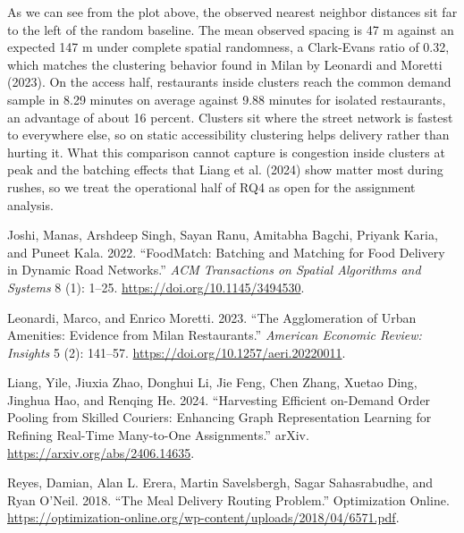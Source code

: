 \documentclass[
  11pt,
]{article}
\newlength{\cslhangindent}
\newenvironment{CSLReferences}[2] %
 {\begin{list}{}{%
  \setlength{\itemindent}{0pt}
  \setlength{\leftmargin}{0pt}
  \setlength{\parsep}{0pt}
  \ifodd #1
   \setlength{\leftmargin}{\cslhangindent}
   \setlength{\itemindent}{-1\cslhangindent}
  \fi
  \setlength{\itemsep}{#2\baselineskip}}}
 {\end{list}}
\begin{document}
As we can see from the plot above, the observed nearest neighbor
distances sit far to the left of the random baseline. The mean observed
spacing is 47 m against an expected 147 m under complete spatial
randomness, a Clark-Evans ratio of 0.32, which matches the clustering
behavior found in Milan by Leonardi and Moretti (2023). On the access
half, restaurants inside clusters reach the common demand sample in 8.29
minutes on average against 9.88 minutes for isolated restaurants, an
advantage of about 16 percent. Clusters sit where the street network is
fastest to everywhere else, so on static accessibility clustering helps
delivery rather than hurting it. What this comparison cannot capture is
congestion inside clusters at peak and the batching effects that Liang
et al. (2024) show matter most during rushes, so we treat the
operational half of RQ4 as open for the assignment analysis.

\label{refs}
\begin{CSLReferences}{1}{0}
Joshi, Manas, Arshdeep Singh, Sayan Ranu, Amitabha Bagchi, Priyank
Karia, and Puneet Kala. 2022. {``FoodMatch: Batching and Matching for
Food Delivery in Dynamic Road Networks.''} \emph{ACM Transactions on
Spatial Algorithms and Systems} 8 (1): 1--25.
\url{https://doi.org/10.1145/3494530}.

Leonardi, Marco, and Enrico Moretti. 2023. {``The Agglomeration of Urban
Amenities: Evidence from Milan Restaurants.''} \emph{American Economic
Review: Insights} 5 (2): 141--57.
\url{https://doi.org/10.1257/aeri.20220011}.

Liang, Yile, Jiuxia Zhao, Donghui Li, Jie Feng, Chen Zhang, Xuetao Ding,
Jinghua Hao, and Renqing He. 2024. {``Harvesting Efficient on-Demand
Order Pooling from Skilled Couriers: Enhancing Graph Representation
Learning for Refining Real-Time Many-to-One Assignments.''} arXiv.
\url{https://arxiv.org/abs/2406.14635}.

Reyes, Damian, Alan L. Erera, Martin Savelsbergh, Sagar Sahasrabudhe,
and Ryan O'Neil. 2018. {``The Meal Delivery Routing Problem.''}
Optimization Online.
\url{https://optimization-online.org/wp-content/uploads/2018/04/6571.pdf}.

\end{CSLReferences}
\end{document}
